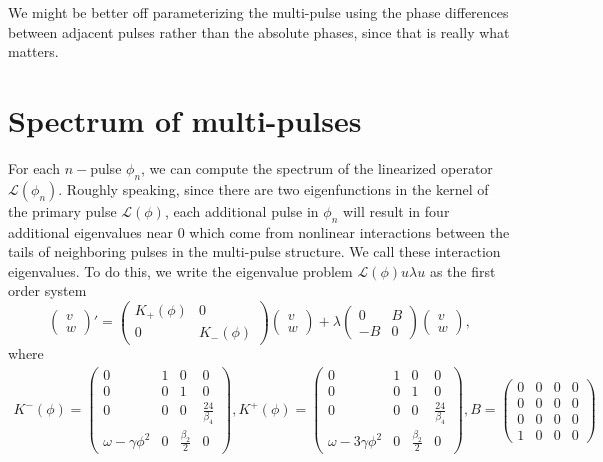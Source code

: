 \documentclass[12pt]{article}
\def\calL{{\mathcal L}}
\begin{document}
We might be better off parameterizing the multi-pulse using the phase differences between adjacent pulses rather than the absolute phases, since that is really what matters.

\section{Spectrum of multi-pulses}

For each $n-$pulse $\phi_n$, we can compute the spectrum of the linearized operator $\calL(\phi_n)$. Roughly speaking, since there are two eigenfunctions in the kernel of the primary pulse $\calL(\phi)$, each additional pulse in $\phi_n$ will result in four additional eigenvalues near 0 which come from nonlinear interactions between the tails of neighboring pulses in the multi-pulse structure. We call these interaction eigenvalues. To do this, we write the eigenvalue problem $\calL(\phi)u \lambda u$ as the first order system
\begin{equation}
\begin{pmatrix}v \\ w\end{pmatrix}' =
\begin{pmatrix}K_+(\phi) & 0 \\ 0 & K_-(\phi) \end{pmatrix}
\begin{pmatrix}v \\ w\end{pmatrix}
+ \lambda \begin{pmatrix}0 & B \\ -B & 0\end{pmatrix}
\begin{pmatrix}v \\ w\end{pmatrix},
\end{equation}
where
\begin{align*}
K^-(\phi) = \begin{pmatrix}
0 & 1 & 0 & 0 \\
0 & 0 & 1 & 0 \\
0 & 0 & 0 & \frac{24}{\beta_4} \\
\omega - \gamma \phi^2 & 0 & \frac{\beta_2}{2} & 0
\end{pmatrix},
K^+(\phi) = \begin{pmatrix}
0 & 1 & 0 & 0 \\
0 & 0 & 1 & 0 \\
0 & 0 & 0 & \frac{24}{\beta_4} \\
\omega - 3 \gamma \phi^2 & 0 & \frac{\beta_2}{2} & 0
\end{pmatrix},
B = \begin{pmatrix}
0 & 0 & 0 & 0 \\
0 & 0 & 0 & 0 \\
0 & 0 & 0 & 0 \\
1 & 0 & 0 & 0
\end{pmatrix}
\end{align*}
\end{document}
